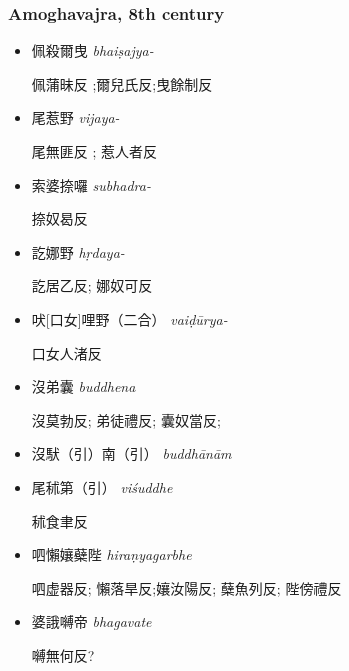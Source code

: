 \documentclass[oneside,a4paper,11pt]{article}
\newcommand{\ipa}[1]{{\phon\textit{#1}}}
\newcommand{\zh}[1]{{\cn #1}}
\newcommand{\zhc}[2]{\zh{#1} \ipa{#2}}
\begin{document}
\subsubsection{Amoghavajra, 8th century}
\citet[29-35]{maspero1920changan}
  \begin{itemize}
 \item \zhc{佩殺爾曳}{bhaiṣajya-}
 
 \zh{佩蒲昧反} ;\zh{爾兒氏反};\zh{曳餘制反} 

 \item \zhc{尾惹野}{vijaya-} 
 
  \zh{尾無匪反} ;   \zh{惹人者反}   
  
 \item \zhc{索婆捺囉}{subhadra-} 
 
   \zh{捺奴曷反}
   
 \item \zhc{訖娜野}{hṛdaya-} 
 
   \zh{訖居乙反};   \zh{娜奴可反}   

\item \zhc{吠[口女]哩野（二合）}{vaiḍūrya-}    

     \zh{口女人渚反}
\item \zhc{沒弟囊}{buddhena} 
    
       \zh{沒莫勃反}; \zh{弟徒禮反}; \zh{囊奴當反};

    \item \zhc{沒䭾（引）南（引）}{buddhānām} 
  
      \item \zhc{尾秫第（引）}{viśuddhe} 
      
             \zh{秫食聿反}
  
             
       \item \zhc{呬懶孃蘗陛}{hiraṇyagarbhe}             
       
  \zh{呬虚器反}; \zh{懶落旱反};\zh{孃汝陽反}; \zh{蘖魚列反};  \zh{陛傍禮反}

\item \zhc{婆誐嚩帝}{bhagavate}

 \zh{嚩無何反}?
\end{itemize}




 
\end{document}
